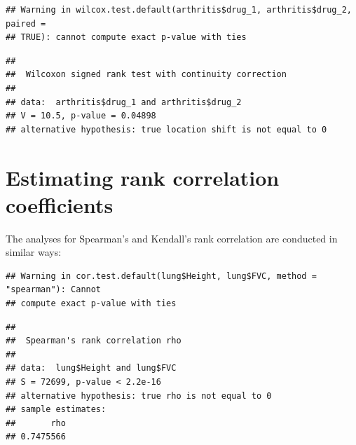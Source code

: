 \documentclass[
]{memoir}
\newenvironment{Shaded}{\begin{snugshade}}{\end{snugshade}}
\newcommand{\AttributeTok}[1]{\textcolor[rgb]{0.77,0.63,0.00}{#1}}
\newcommand{\ConstantTok}[1]{\textcolor[rgb]{0.00,0.00,0.00}{#1}}
\newcommand{\FunctionTok}[1]{\textcolor[rgb]{0.00,0.00,0.00}{#1}}
\newcommand{\NormalTok}[1]{#1}
\newcommand{\OtherTok}[1]{\textcolor[rgb]{0.56,0.35,0.01}{#1}}
\newcommand{\SpecialCharTok}[1]{\textcolor[rgb]{0.00,0.00,0.00}{#1}}
\newcommand{\StringTok}[1]{\textcolor[rgb]{0.31,0.60,0.02}{#1}}
\begin{document}
\begin{Shaded}
\end{Shaded}

\begin{verbatim}
## Warning in wilcox.test.default(arthritis$drug_1, arthritis$drug_2, paired =
## TRUE): cannot compute exact p-value with ties
\end{verbatim}

\begin{verbatim}
## 
##  Wilcoxon signed rank test with continuity correction
## 
## data:  arthritis$drug_1 and arthritis$drug_2
## V = 10.5, p-value = 0.04898
## alternative hypothesis: true location shift is not equal to 0
\end{verbatim}

\hypertarget{estimating-rank-correlation-coefficients}{%
\section{Estimating rank correlation coefficients}\label{estimating-rank-correlation-coefficients}}

The analyses for Spearman's and Kendall's rank correlation are conducted in similar ways:

\begin{Shaded}
\end{Shaded}

\begin{verbatim}
## Warning in cor.test.default(lung$Height, lung$FVC, method = "spearman"): Cannot
## compute exact p-value with ties
\end{verbatim}

\begin{verbatim}
## 
##  Spearman's rank correlation rho
## 
## data:  lung$Height and lung$FVC
## S = 72699, p-value < 2.2e-16
## alternative hypothesis: true rho is not equal to 0
## sample estimates:
##       rho 
## 0.7475566
\end{verbatim}
\end{document}
